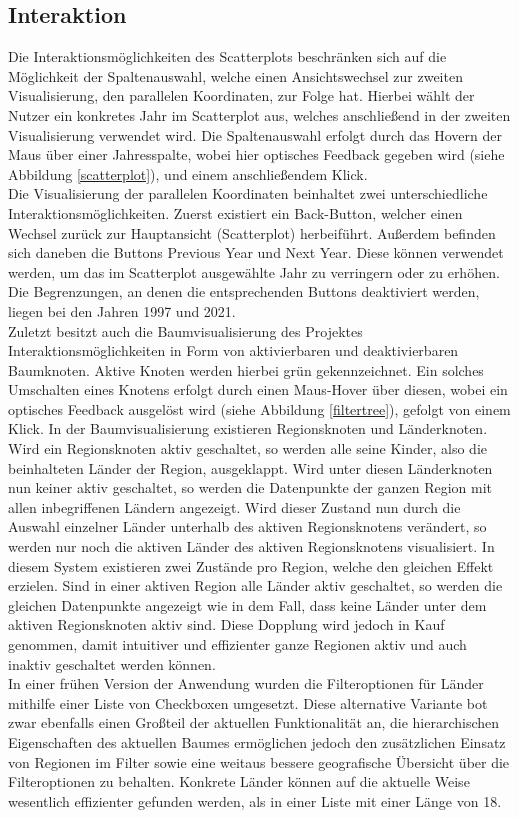 \documentclass[usegeometry=true]{scrartcl}
\begin{document}
\subsection{Interaktion} \label{interaktion}
Die Interaktionsmöglichkeiten des Scatterplots beschränken sich auf die Möglichkeit der Spaltenauswahl, welche einen Ansichtswechsel zur zweiten Visualisierung, den parallelen Koordinaten, zur Folge hat. Hierbei wählt der Nutzer ein konkretes Jahr im Scatterplot aus, welches anschließend in der zweiten Visualisierung verwendet wird. Die Spaltenauswahl erfolgt durch das Hovern der Maus über einer Jahresspalte, wobei hier optisches Feedback gegeben wird (siehe Abbildung \ref{scatterplot}), und einem anschließendem Klick.\\ Die Visualisierung der parallelen Koordinaten beinhaltet zwei unterschiedliche Interaktionsmöglichkeiten. Zuerst existiert ein \glqq Back\grqq-Button, welcher einen Wechsel zurück zur Hauptansicht (Scatterplot) herbeiführt. Außerdem befinden sich daneben die Buttons \glqq Previous Year\grqq{} und \glqq Next Year\grqq. Diese können verwendet werden, um das im Scatterplot ausgewählte Jahr zu verringern oder zu erhöhen. Die Begrenzungen, an denen die entsprechenden Buttons deaktiviert werden, liegen bei den Jahren 1997 und 2021.\\ Zuletzt besitzt auch die Baumvisualisierung des Projektes Interaktionsmöglichkeiten in Form von aktivierbaren und deaktivierbaren Baumknoten. Aktive Knoten werden hierbei grün gekennzeichnet. Ein solches Umschalten eines Knotens erfolgt durch einen Maus-Hover über diesen, wobei ein optisches Feedback ausgelöst wird (siehe Abbildung \ref{filtertree}), gefolgt von einem Klick. In der Baumvisualisierung existieren Regionsknoten und Länderknoten. Wird ein Regionsknoten aktiv geschaltet, so werden alle seine Kinder, also die beinhalteten Länder der Region, \glqq ausgeklappt\grqq. Wird unter diesen Länderknoten nun keiner aktiv geschaltet, so werden die Datenpunkte der ganzen Region mit allen inbegriffenen Ländern angezeigt. Wird dieser Zustand nun durch die Auswahl einzelner Länder unterhalb des aktiven Regionsknotens verändert, so werden nur noch die aktiven Länder des aktiven Regionsknotens visualisiert. In diesem System existieren zwei Zustände pro Region, welche den gleichen Effekt erzielen. Sind in einer aktiven Region alle Länder aktiv geschaltet, so werden die gleichen Datenpunkte angezeigt wie in dem Fall, dass keine Länder unter dem aktiven Regionsknoten aktiv sind. Diese Dopplung wird jedoch in Kauf genommen, damit intuitiver und effizienter ganze Regionen aktiv und auch inaktiv geschaltet werden können.\\ In einer frühen Version der Anwendung wurden die Filteroptionen für Länder mithilfe einer Liste von Checkboxen umgesetzt. Diese alternative Variante bot zwar ebenfalls einen Großteil der aktuellen Funktionalität an, die hierarchischen Eigenschaften des aktuellen Baumes ermöglichen jedoch den zusätzlichen Einsatz von Regionen im Filter sowie eine weitaus bessere geografische Übersicht über die Filteroptionen zu behalten. Konkrete Länder können auf die aktuelle Weise wesentlich effizienter gefunden werden, als in einer Liste mit einer Länge von 18.\\
\end{document}
